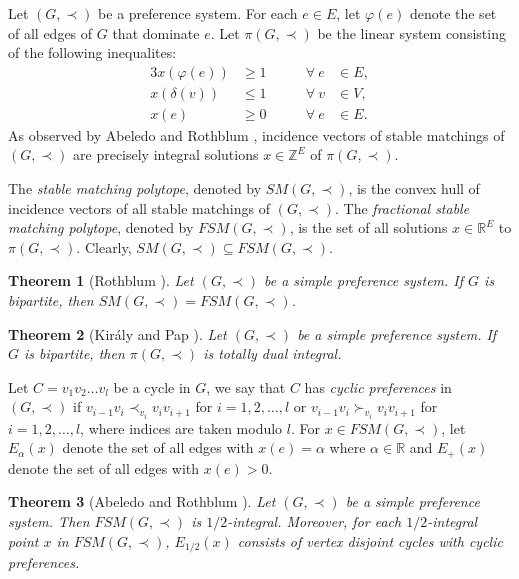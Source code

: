 \documentclass[11pt]{article}
\newtheorem{theorem}{Theorem}%
\numberwithin{theorem}{section}
\begin{document}
Let $(G,\prec)$ be a preference system. For each $e\in E$, let $\varphi(e)$ denote the set of all edges of $G$ that dominate $e$. Let $\pi(G,\prec)$ be the linear system consisting of the following inequalites:
\begin{alignat}{3}
x(\varphi(e)) &\geq 1 &\qquad \forall ~e &\in E,\label{stability constraints}\\
x(\delta(v)) &\leq 1 &\qquad \forall ~v &\in V,\label{matching constraints}\\
x(e) &\geq 0 &\qquad \forall ~e &\in E.\label{edge nonnegativity}
\end{alignat}
As observed by Abeledo and Rothblum \cite{AbelRoth94}, incidence vectors of stable matchings of $(G,\prec)$ are precisely integral solutions $x\in \mathbb{Z}^E$ of $\pi(G,\prec)$.

The \textit{stable matching polytope}, denoted by $SM(G,\prec)$, is the convex hull of incidence vectors of all stable matchings of $(G,\prec)$. The \textit{fractional stable matching polytope}, denoted by $FSM(G,\prec)$, is the set of all solutions $x\in \mathbb{R}^E$ to $\pi(G,\prec)$. Clearly, $SM(G,\prec)\subseteq FSM(G,\prec)$. 

\begin{theorem}[Rothblum \cite{Roth92}]
\label{thm:Roth92}
Let $(G,\prec)$ be a simple preference system. If $G$ is bipartite, then
$SM(G,\prec)=FSM(G,\prec)$.
\end{theorem}

\begin{theorem}[Kir\'{a}ly and Pap \cite{KiraPap08}]
\label{thm:KiraPap08}
Let $(G,\prec)$ be a simple preference system. If $G$ is bipartite, then $\pi(G,\prec)$ is totally dual integral.
\end{theorem}

Let $C=v_1 v_2 \ldots v_l$ be a cycle in $G$, we say that $C$ has \textit{cyclic preferences} in $(G,\prec)$ if
$v_{i-1} v_i \prec_{v_i} v_i v_{i+1}$ for $i=1,2,\ldots,l$
or $v_{i-1} v_i\succ_{v_i} v_i v_{i+1}$ for $i=1,2,\ldots,l$,
where indices are taken modulo $l$.
For $x\in FSM(G,\prec)$, let $E_{\alpha}(x)$ denote the set of all edges with $x(e)=\alpha$ where $\alpha\in\mathbb{R}$ and $E_+(x)$ denote the set of all edges with $x(e)>0$.

\begin{theorem}[Abeledo and Rothblum \cite{AbelRoth94}]
\label{thm:AbelRoth94}
Let $(G,\prec)$ be a simple preference system. Then $FSM(G,\prec)$ is $1/2$-integral. Moreover, for each $1/2$-integral point $x$ in $FSM(G,\prec)$, $E_{1/2}(x)$ consists of vertex disjoint cycles with cyclic preferences.
\end{theorem} 
\end{document}
